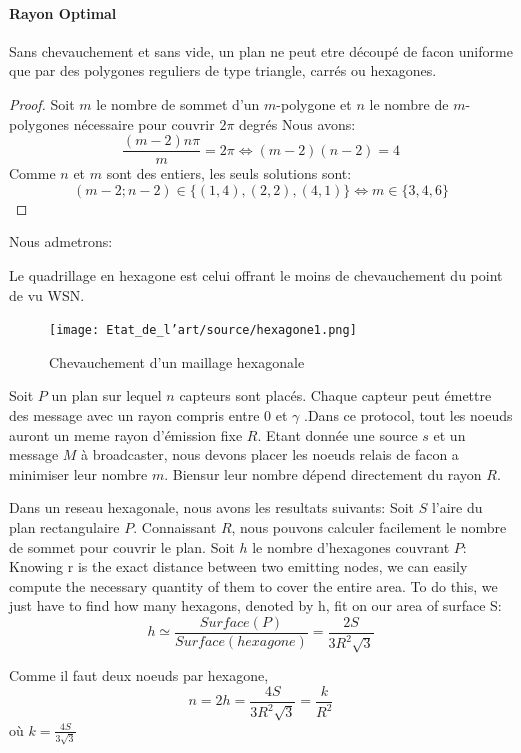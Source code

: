 \paragraph{Rayon Optimal}


\begin{myth}
Sans chevauchement et sans vide, un plan ne peut etre découpé de facon uniforme que par des polygones reguliers de type triangle, carrés ou hexagones.
\end{myth}
\begin{proof}
 Soit $m$ le nombre de sommet d'un $m$-polygone et $n$ le nombre de $m$-polygones nécessaire pour couvrir $2\pi$ degrés
Nous avons: $$\frac{(m-2)n\pi}{m}=2\pi \Leftrightarrow (m-2)(n-2)=4$$
Comme $n$ et $m$ sont des entiers, les seuls solutions sont: $$(m-2;n-2)\in\{(1,4),(2,2),(4,1) \} \Leftrightarrow m \in \{ 3,4,6 \}$$
\end{proof}
Nous admetrons:
\begin{myth}
 Le quadrillage en hexagone est celui offrant le moins de chevauchement du point de vu WSN.
\end{myth}
\begin{figure}[H]
\centering
\texttt{[image: Etat\_de\_l'art/source/hexagone1.png]}
\caption{ Chevauchement d'un maillage hexagonale}
\end{figure} 

Soit $P$ un plan sur lequel $n$ capteurs sont placés. Chaque capteur peut émettre des message avec un rayon compris entre 0 et $\gamma$ .Dans ce protocol, tout les noeuds auront un meme rayon d'émission fixe $R$.
Etant donnée une source $s$ et un message $M$ à broadcaster, nous devons placer les noeuds relais de facon a minimiser leur nombre $m$. Biensur leur nombre dépend directement du rayon $R$.
 

Dans un reseau hexagonale, nous avons les resultats suivants:
Soit $S$ l'aire du plan rectangulaire $P$. Connaissant $R$, nous pouvons calculer facilement le nombre de sommet pour couvrir le plan.
Soit $h$ le nombre d'hexagones couvrant $P$: 
Knowing r is the exact distance between two emitting
nodes, we can easily compute the necessary quantity of them
to cover the entire area. To do this, we just have to find how
many hexagons, denoted by h, fit on our area of surface S:
$$h \simeq \frac{Surface ( P)}{Surface(hexagone)}=\frac{2S}{3R^2 \sqrt{3}}$$

Comme il faut deux noeuds par hexagone,$$n=2h=\frac{4S}{3R^2 \sqrt{3}}= \frac{k}{R^2}$$ où $k=\frac{4S}{3 \sqrt{3}}$

